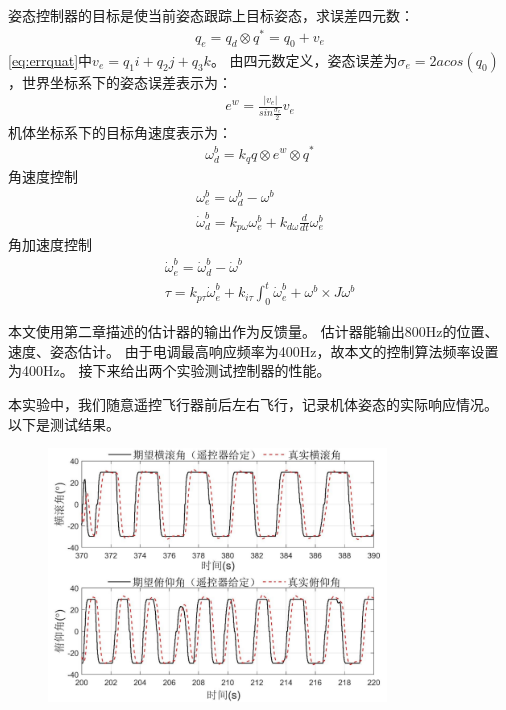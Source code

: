 \documentclass[
  type=master
]{gdutthesis}
\begin{document}
姿态控制器的目标是使当前姿态跟踪上目标姿态，求误差四元数：\vspace{1ex}
\begin{gather}\label{eq:errquat}
	q_e = q_d \otimes q^{*} = q_0 + v_e
\end{gather}
\autoref{eq:errquat}中$v_e = q_1 i + q_2 j + q_3 k$。
由四元数定义，姿态误差为$\sigma_e = 2acos(q_0)$，世界坐标系下的姿态误差表示为：
\begin{gather}
	e^w = \frac{\left| v_e \right|}{sin\frac{\sigma_e}{2}} v_e
\end{gather}
机体坐标系下的目标角速度表示为：
\begin{gather}
	\omega^b_d = k_q q \otimes e^w \otimes q^{*}
\end{gather}
角速度控制
\begin{gather}\label{eq:angularacontrol}
	\omega^b_e = \omega^b_d - \omega^b\\
	\dot{\omega}^b_d = k_{p \omega} \omega^b_e + k_{d \omega} \frac{d}{dt}\omega^b_e
\end{gather}
角加速度控制
\begin{gather}\label{eq:angularaccelerationcontrol}
		\dot{\omega}^b_e = \dot{\omega}^b_d - \dot{\omega}^b\\
		\tau = k_{p \tau} \dot{\omega}^b_e + k_{i \tau} \int_{0}^{t}\dot{\omega}^b_e + \omega^b \times J \omega^b
\end{gather}

本文使用第二章描述的估计器的输出作为反馈量。
估计器能输出800Hz的位置、速度、姿态估计。
由于电调最高响应频率为400Hz，故本文的控制算法频率设置为400Hz。
接下来给出两个实验测试控制器的性能。

本实验中，我们随意遥控飞行器前后左右飞行，记录机体姿态的实际响应情况。
以下是测试结果。

\begin{figure}[htbp]
	\centering
	\includegraphics[width=0.8\textwidth]{屏幕截图 2022-04-06 150427.png}
	\label{fig:Rptrackingresults}
\end{figure}
\end{document}
